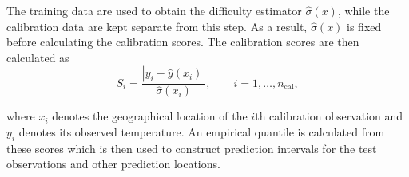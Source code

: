 The training data are used to obtain the difficulty estimator $\hat{\sigma}(x)$, while the calibration data are kept separate from this step. As a result, $\hat{\sigma}(x)$ is fixed before calculating the calibration scores. The calibration scores are then calculated as
\begin{equation}
S_i =
\frac{|y_i-\hat{y}(x_i)|}
{\hat{\sigma}(x_i)},
\qquad i=1,\ldots,n_{\mathrm{cal}},
\end{equation}

where $x_i$ denotes the geographical location of the $i$th calibration observation and $y_i$ denotes its observed temperature. An empirical quantile is calculated from these scores which is then used to construct prediction intervals for the test observations and other prediction locations.



